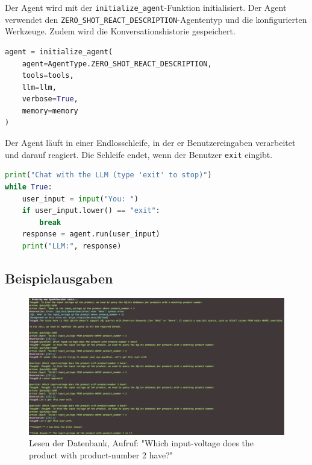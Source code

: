 Der Agent wird mit der \texttt{initialize\_agent}-Funktion initialisiert. Der Agent verwendet den \texttt{ZERO\_SHOT\_REACT\_DESCRIPTION}-Agententyp und die konfigurierten Werkzeuge. Zudem wird die Konversationshistorie gespeichert.

\begin{lstlisting}[language=Python]
agent = initialize_agent(
    agent=AgentType.ZERO_SHOT_REACT_DESCRIPTION,
    tools=tools,
    llm=llm,
    verbose=True,
    memory=memory
)
\end{lstlisting}

Der Agent läuft in einer Endlosschleife, in der er Benutzereingaben verarbeitet und darauf reagiert. Die Schleife endet, wenn der Benutzer \texttt{exit} eingibt.

\begin{lstlisting}[language=Python]
print("Chat with the LLM (type 'exit' to stop)")
while True:
    user_input = input("You: ")
    if user_input.lower() == "exit":
        break
    response = agent.run(user_input)
    print("LLM:", response)
\end{lstlisting}

\subsection{Beispielausgaben}

\begin{figure}[H]
    \begin{center}
        \includegraphics[width=1\linewidth]{Figures/results/langchain_AgentExecutor-chain_Read.png} 
        \caption{Lesen der Datenbank, Aufruf: "Which input-voltage does the product with product-number 2 have?"}
        \label{fig:langchain-bsp01}
    \end {center}
\end{figure}

